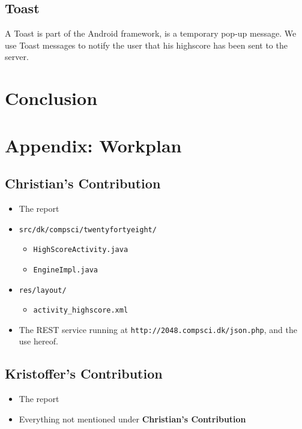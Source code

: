 \documentclass[a4paper, 12pt]{article}
\newcommand{\code}[1]{\texttt{#1}}
\begin{document}
\subsection{Toast}
A Toast is part of the Android framework, is a temporary pop-up message. We use Toast messages to notify the user that his highscore has been sent to the server.


\section{Conclusion}

\newpage
\section{Appendix: Workplan}
\subsection{Christian's Contribution}
\begin{itemize}
\item The report
\item \code{src/dk/compsci/twentyfortyeight/}
  \begin{itemize}
  \item \code{HighScoreActivity.java}
  \item \code{EngineImpl.java}
  \end{itemize}
\item \code{res/layout/}
  \begin{itemize}
  \item \code{activity\_highscore.xml}
  \end{itemize}
\item The REST service running at \code{http://2048.compsci.dk/json.php}, and the use hereof.
\end{itemize}
\subsection{Kristoffer's Contribution}
\begin{itemize}
\item The report
\item Everything not mentioned under \textbf{Christian's Contribution}
\end{itemize}
\end{document}
